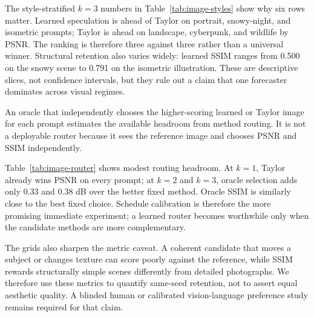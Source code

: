 \documentclass[11pt,a4paper]{article}
\begin{document}
The style-stratified $k=3$ numbers in Table~\ref{tab:image-styles} show why six
rows matter. Learned speculation is ahead of Taylor on portrait, snowy-night,
and isometric prompts; Taylor is ahead on landscape, cyberpunk, and wildlife by
PSNR. The ranking is therefore three against three rather than a universal
winner. Structural retention also varies widely: learned SSIM ranges from 0.500
on the snowy scene to 0.791 on the isometric illustration. These are descriptive
slices, not confidence intervals, but they rule out a claim that one forecaster
dominates across visual regimes.

\begin{table}[H]
\centering
\scriptsize

\caption{Style-slice ablation at $k=3$ over the six recorded prompts. Each row
contains one image per method, so the values describe examples rather than a
population estimate.}
\label{tab:image-styles}
\end{table}

An oracle that independently chooses the higher-scoring learned or Taylor image
for each prompt estimates the available headroom from method routing. It is not
a deployable router because it sees the reference image and chooses PSNR and
SSIM independently.

\begin{table}[H]
\centering
\small

\caption{Reference-aware oracle routing between the learned and Taylor
candidates. The oracle is an unavailable upper bound, not an evaluated routing
algorithm. Higher is better.}
\label{tab:image-router}
\end{table}

Table~\ref{tab:image-router} shows modest routing headroom. At $k=1$, Taylor
already wins PSNR on every prompt; at $k=2$ and $k=3$, oracle selection adds
only 0.33 and 0.38 dB over the better fixed method. Oracle SSIM is similarly
close to the best fixed choice. Schedule calibration is therefore the more
promising immediate experiment; a learned router becomes worthwhile only when
the candidate methods are more complementary.

The grids also sharpen the metric caveat. A coherent candidate that moves a
subject or changes texture can score poorly against the reference, while SSIM
rewards structurally simple scenes differently from detailed photographs. We
therefore use these metrics to quantify same-seed retention, not to assert equal
aesthetic quality. A blinded human or calibrated vision-language preference
study remains required for that claim.
\end{document}
